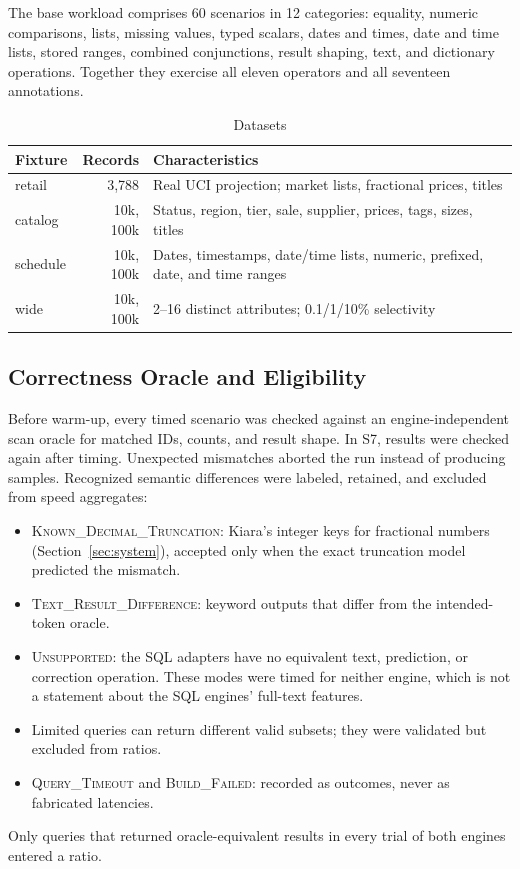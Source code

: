 The base workload comprises 60 scenarios in 12 categories: equality, numeric comparisons, lists, missing values, typed scalars, dates and times, date and time lists, stored ranges, combined conjunctions, result shaping, text, and dictionary operations. Together they exercise all eleven operators and all seventeen annotations.

\begin{table}[t]
\centering
\caption{Datasets}
\label{tab:datasets}
\setlength{\tabcolsep}{3pt}
\begin{tabular}{@{}lrP{50mm}@{}}
\toprule
Fixture & Records & Characteristics \\
\midrule
retail & 3,788 & Real UCI projection; market lists, fractional prices, titles \\
catalog & 10k, 100k & Status, region, tier, sale, supplier, prices, tags, sizes, titles \\
schedule & 10k, 100k & Dates, timestamps, date/time lists, numeric, prefixed, date, and time ranges \\
wide & 10k, 100k & 2--16 distinct attributes; 0.1/1/10\% selectivity \\
\bottomrule
\end{tabular}
\end{table}

\subsection{Correctness Oracle and Eligibility}
\label{sec:oracle}
Before warm-up, every timed scenario was checked against an engine-independent scan oracle for matched IDs, counts, and result shape. In S7, results were checked again after timing. Unexpected mismatches aborted the run instead of producing samples. Recognized semantic differences were labeled, retained, and excluded from speed aggregates:
\begin{itemize}
\item \textsc{Known\_Decimal\_Truncation}: Kiara's integer keys for fractional numbers (Section~\ref{sec:system}), accepted only when the exact truncation model predicted the mismatch.
\item \textsc{Text\_Result\_Difference}: keyword outputs that differ from the intended-token oracle.
\item \textsc{Unsupported}: the SQL adapters have no equivalent text, prediction, or correction operation. These modes were timed for neither engine, which is not a statement about the SQL engines' full-text features.
\item Limited queries can return different valid subsets; they were validated but excluded from ratios.
\item \textsc{Query\_Timeout} and \textsc{Build\_Failed}: recorded as outcomes, never as fabricated latencies.
\end{itemize}
Only queries that returned oracle-equivalent results in every trial of both engines entered a ratio.

